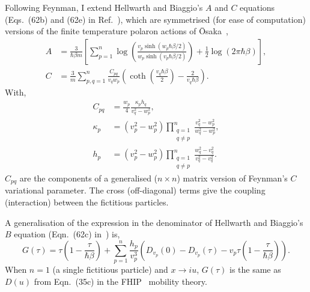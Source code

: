 Following Feynman, I extend Hellwarth and Biaggio's $A$ and $C$ equations (Eqs.~(62b) and (62e) in Ref.~\cite{hellwarth_mobility_1999}), which are symmetrised (for ease of computation) versions of the finite temperature polaron actions of \=Osaka~\cite{osaka_polaron_1959}, 
\begin{subequations}
\begin{align}
    A &= \frac{3}{\hbar \beta m} \left[ \sum_{p = 1}^n \log\left(\frac{v_{p} \sinh (w_{p} \hbar \beta / 2)}{w_{p} \sinh (v_{p} \hbar \beta / 2)}\right) + \frac{1}{2} \log \left(2\pi\hbar \beta\right) \right] , \label{eqn:A} \\
    C &= \frac{3}{m} \sum_{p, q = 1}^n \frac{C_{pq}}{v_{q} w_{p}} \left( \coth \left( \frac{v_{q} \hbar \beta}{2} \right) - \frac{2}{v_{q} \hbar \beta} \right) . \label{eqn:C}
\end{align}
\end{subequations}
With, 
\begin{subequations}
    \begin{align}
        C_{pq} &= \frac{w_{p}}{4} \frac{\kappa_{p} h_{q}}{v_{q}^2 - w_{p}^2} ,\\
        \kappa_{p} &= \left(v_{p}^2 - w_{p}^2 \right) \prod\limits_{\substack{q=1 \\ q\neq p}}^n \frac{v_{q}^2 - w_{p}^2}{w_{q}^2 - w_{p}^2} ,\\
        h_{p} &= \left( v_{p}^2 - w_{p}^2 \right) \prod\limits_{\substack{q=1 \\ q\neq p}}^n \frac{w_{q}^2 - v_{q}^2}{v_{q}^2 - v_{q}^2} .
    \end{align}
\end{subequations}
$C_{pq}$ are the components of a generalised ($n \times n$) matrix version of Feynman's $C$ variational parameter. The cross (off-diagonal) terms give the coupling (interaction) between the fictitious particles.

A generalisation of the expression in the denominator of Hellwarth and Biaggio's $B$ equation (Eqn.~(62c) in~\cite{hellwarth_mobility_1999}) is,
\begin{equation}\label{eqn:multi_D}
    G(\tau) = \tau  \left(1 - \frac{\tau}{\hbar\beta}\right) + \sum_{p=1}^n \frac{h_p}{v_p^3} \left(D_{v_p}(0) - D_{v_p}(\tau) - v_p \tau \left(1 - \frac{\tau}{\hbar\beta} \right)\right).
\end{equation}
When $n=1$ (a single fictitious particle) and $x \rightarrow iu$, $G(\tau)$ is the same as $D(u)$ from Eqn.~(35c) in the FHIP~\cite{feynman_mobility_1962} mobility theory. 

